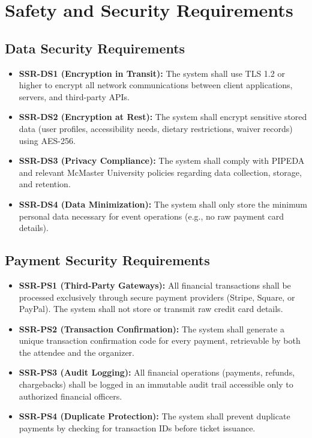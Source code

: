 \documentclass{article}
\begin{document}
\section{Safety and Security Requirements}

\subsection{Data Security Requirements}
\begin{itemize}
    \item \textbf{SSR-DS1 (Encryption in Transit):} The system shall use TLS 1.2 or higher to encrypt all network communications between client applications, servers, and third-party APIs.
    \item \textbf{SSR-DS2 (Encryption at Rest):} The system shall encrypt sensitive stored data (user profiles, accessibility needs, dietary restrictions, waiver records) using AES-256.
    \item \textbf{SSR-DS3 (Privacy Compliance):} The system shall comply with PIPEDA and relevant McMaster University policies regarding data collection, storage, and retention.
    \item \textbf{SSR-DS4 (Data Minimization):} The system shall only store the minimum personal data necessary for event operations (e.g., no raw payment card details).
\end{itemize}

\subsection{Payment Security Requirements}
\begin{itemize}
    \item \textbf{SSR-PS1 (Third-Party Gateways):} All financial transactions shall be processed exclusively through secure payment providers (Stripe, Square, or PayPal). The system shall not store or transmit raw credit card details.
    \item \textbf{SSR-PS2 (Transaction Confirmation):} The system shall generate a unique transaction confirmation code for every payment, retrievable by both the attendee and the organizer.
    \item \textbf{SSR-PS3 (Audit Logging):} All financial operations (payments, refunds, chargebacks) shall be logged in an immutable audit trail accessible only to authorized financial officers.
    \item \textbf{SSR-PS4 (Duplicate Protection):} The system shall prevent duplicate payments by checking for transaction IDs before ticket issuance.
\end{itemize}
\end{document}
